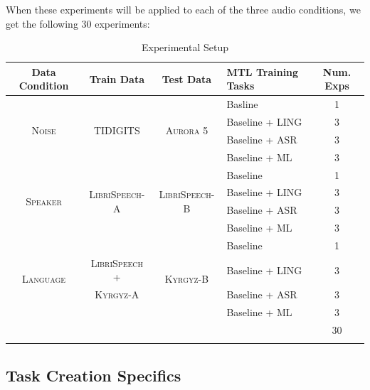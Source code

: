 \documentclass[10pt,a4paper]{article}
\begin{document}
When these experiments will be applied to each of the three audio conditions, we get the following 30 experiments:

\begin{table}[!htbp]
  \centering
  \begin{adjustbox}{width=.75\textwidth}
    \begin{tabular}{ccclc}
      \toprule
      \textbf{Data Condition} & \textbf{Train Data} & \textbf{Test Data} & \textbf{MTL Training Tasks} & \textbf{Num. Exps} \\
      \midrule
      \multirow{4}{*}{\textsc{Noise}} & \multirow{4}{*}{\textsc{TIDIGITS}} & \multirow{4}{*}{\textsc{Aurora 5}} & Basline & 1\\
      & & & Baseline + LING & 3   \\
      & & & Baseline + ASR  & 3  \\
      & & & Baseline + ML   & 3  \\
      \midrule
      \multirow{4}{*}{\textsc{Speaker}} & \multirow{4}{*}{\textsc{LibriSpeech-A}} & \multirow{4}{*}{\textsc{LibriSpeech-B}} & Baseline & 1 \\
      & & & Baseline + LING & 3  \\
      & & & Baseline + ASR  & 3  \\
      & & & Baseline + ML   & 3  \\     \midrule
      \multirow{4}{*}{\textsc{Language}} & & \multirow{4}{*}{\textsc{Kyrgyz-B}} & Baseline & 1\\
      & \textsc{LibriSpeech +} & & Baseline + LING  & 3 \\
      &  \textsc{Kyrgyz-A} & & Baseline + ASR   & 3 \\
      & & & Baseline + ML & 3 \\
      \midrule
      &&&& 30\\
      \bottomrule\\
    \end{tabular}
    \label{table:data}
  \end{adjustbox}
  
  \caption{Experimental Setup}
  
\end{table}


\subsection{Task Creation Specifics}
\end{document}

